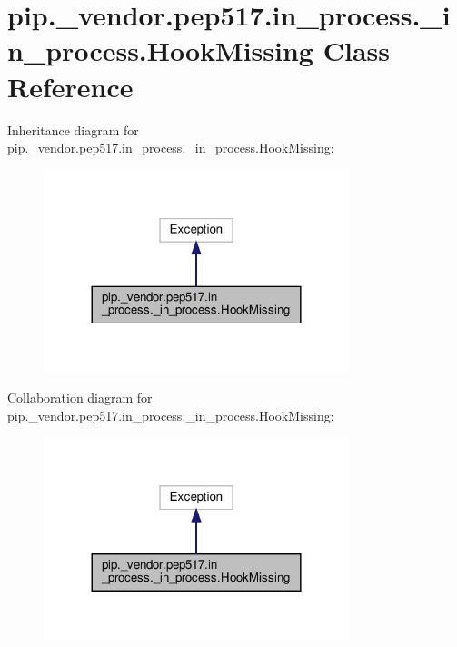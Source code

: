 \hypertarget{classpip_1_1__vendor_1_1pep517_1_1in__process_1_1__in__process_1_1HookMissing}{}\section{pip.\+\_\+vendor.\+pep517.\+in\+\_\+process.\+\_\+in\+\_\+process.\+Hook\+Missing Class Reference}
\label{classpip_1_1__vendor_1_1pep517_1_1in__process_1_1__in__process_1_1HookMissing}


Inheritance diagram for pip.\+\_\+vendor.\+pep517.\+in\+\_\+process.\+\_\+in\+\_\+process.\+Hook\+Missing\+:
\nopagebreak
\begin{figure}[H]
\begin{center}
\leavevmode
\includegraphics[width=252pt]{classpip_1_1__vendor_1_1pep517_1_1in__process_1_1__in__process_1_1HookMissing__inherit__graph}
\end{center}
\end{figure}


Collaboration diagram for pip.\+\_\+vendor.\+pep517.\+in\+\_\+process.\+\_\+in\+\_\+process.\+Hook\+Missing\+:
\nopagebreak
\begin{figure}[H]
\begin{center}
\leavevmode
\includegraphics[width=252pt]{classpip_1_1__vendor_1_1pep517_1_1in__process_1_1__in__process_1_1HookMissing__coll__graph}
\end{center}
\end{figure}
